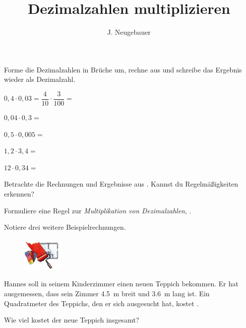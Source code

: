 \documentclass[10pt, a4paper]{scrartcl}
\author{J. Neugebauer}
\title{Dezimalzahlen multiplizieren}
\date{\Heute}
\begin{document}
	\ReiheTitel
	
	\begin{aufgabe}\label{aufg:1}
		Forme die Dezimalzahlen in Brüche um, rechne aus und schreibe das Ergebnis wieder als Dezimalzahl.
		
		\begin{enumeratea}
			\item $0,4\cdot 0,03 = \dfrac{4}{10}\cdot \dfrac{3}{100} = $\linievoll
			\item $0,04\cdot 0,3 = $\linievoll
			\item $0,5\cdot 0,005 = $\linievoll
			\item $1,2\cdot 3,4 = $\linievoll
			\item $12\cdot 0,34 = $\linievoll
		\end{enumeratea}
	\end{aufgabe}

	\begin{aufgabe}
		Betrachte die Rechnungen und Ergebnisse aus . Kannst du Regelmäßigkeiten erkennen?\smallskip
		
		Formuliere eine Regel zur \emph{Multiplikation von Dezimalzahlen}, .\smallskip
		
		
	\end{aufgabe}

	\begin{aufgabe}
		Notiere drei weitere Beispielrechnungen.
		
		\feldLin[1cm]{3}
	\end{aufgabe}
	
	\begin{aufgabe}
		\begin{wrapfig}
		\begin{figure}
			\includegraphics[width=2cm]{6-AB.III.4-Abb_Renovieren}
		\end{figure}
		Hannes soll in seinem Kinderzimmer einen neuen Teppich bekommen. Er hat ausgemessen, dass sein Zimmer \SI{4,5}{\meter} breit und \SI{3,6}{\meter} lang ist. Ein Quadratmeter des Teppichs, den er sich ausgesucht hat, kostet .\medskip
		\end{wrapfig}
		
		Wie viel kostet der neue Teppich insgesamt?\medskip
		
		\feldKar{6}
	\end{aufgabe}
\end{document}
